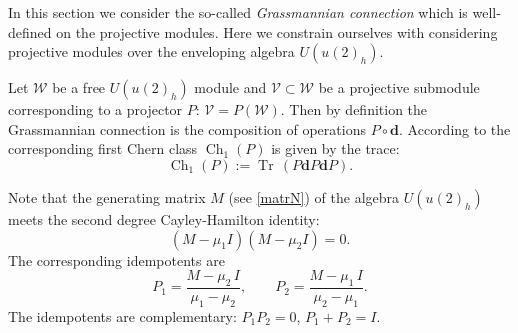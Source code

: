 \documentclass[11pt]{article}
\DeclareMathOperator{\Tr}{Tr}
\newcommand{\dd}{\mathbf{d}}
\DeclareMathOperator{\Ch}{Ch}
\numberwithin{equation}{section}
\theoremstyle{plain}
\theoremstyle{definition}
\begin{document}
In this section we consider the so-called \emph{Grassmannian connection} which is well-defined on the projective modules. Here
we constrain ourselves with considering projective modules over the enveloping algebra $U(u(2)_h)$.

Let $\mathcal{W}$ be a free $U(u(2)_h)$ module and $\mathcal{V}\subset \mathcal{W}$ be a projective submodule corresponding to
a projector $P$: $\mathcal{V} = P(\mathcal{W})$. Then by definition the Grassmannian connection is the composition
of operations $P\circ \dd$. According to \cite{Gom} the corresponding first Chern class ${\Ch_1(P)}$ is given by the trace:
\[
{\Ch_1(P)} := \Tr\, (P \dd P \dd P).
\]

Note that the generating matrix $M$ (see  \eqref{matrN}) of the algebra $U(u(2)_h)$ meets the second degree Cayley-Hamilton identity:
\[
(M-\mu_1I)(M-\mu_2I) = 0.
\]
The corresponding idempotents are
\[
P_1=\frac{M-\mu_2\, I}{\mu_1-\mu_2},\qquad P_2 =\frac{M-\mu_1\, I}{\mu_2-\mu_1}.
\]
The idempotents are complementary: $P_1P_2=0$, $ P_1+P_2=I$.
\end{document}
